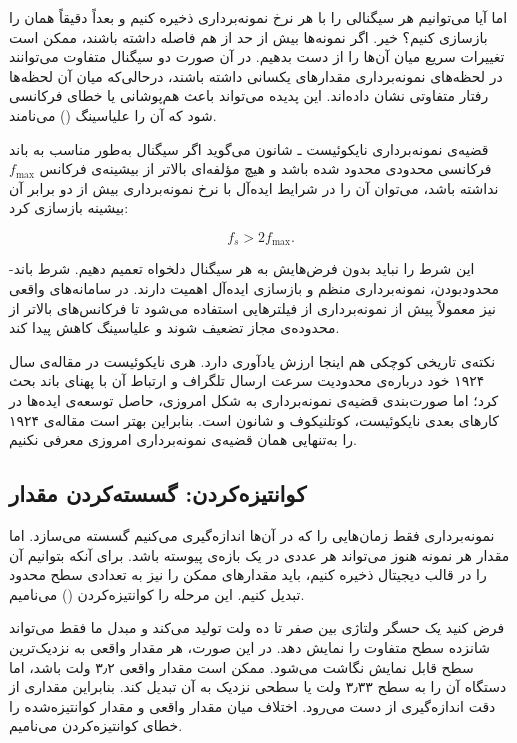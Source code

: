 اما آیا می‌توانیم هر سیگنالی را با هر نرخ نمونه‌برداری ذخیره کنیم و بعداً دقیقاً همان را بازسازی کنیم؟ خیر. اگر نمونه‌ها بیش از حد از هم فاصله داشته باشند، ممکن است تغییرات سریع میان آن‌ها را از دست بدهیم. در آن صورت دو سیگنال متفاوت می‌توانند در لحظه‌های نمونه‌برداری مقدارهای یکسانی داشته باشند، درحالی‌که میان آن لحظه‌ها رفتار متفاوتی نشان داده‌اند. این پدیده می‌تواند باعث هم‌پوشانی یا خطای فرکانسی شود که آن را علیاسینگ () می‌نامند.

قضیه‌ی نمونه‌برداری نایکوئیست ـ شانون می‌گوید اگر سیگنال به‌طور مناسب به باند فرکانسی محدودی محدود شده باشد و هیچ مؤلفه‌ای بالاتر از بیشینه‌ی فرکانس \(f_{\max}\) نداشته باشد، می‌توان آن را در شرایط ایده‌آل با نرخ نمونه‌برداری بیش از دو برابر آن بیشینه بازسازی کرد:

\[
f_s>2f_{\max}.
\]

این شرط را نباید بدون فرض‌هایش به هر سیگنال دلخواه تعمیم دهیم. شرط باند-محدودبودن، نمونه‌برداری منظم و بازسازی ایده‌آل اهمیت دارند. در سامانه‌های واقعی نیز معمولاً پیش از نمونه‌برداری از فیلترهایی استفاده می‌شود تا فرکانس‌های بالاتر از محدوده‌ی مجاز تضعیف شوند و علیاسینگ کاهش پیدا کند. \autocite{cmu-sampling-theorem}

نکته‌ی تاریخی کوچکی هم اینجا ارزش یادآوری دارد. هری نایکوئیست در مقاله‌ی سال ۱۹۲۴ خود درباره‌ی محدودیت سرعت ارسال تلگراف و ارتباط آن با پهنای باند بحث کرد؛ اما صورت‌بندی قضیه‌ی نمونه‌برداری به شکل امروزی، حاصل توسعه‌ی ایده‌ها در کارهای بعدی نایکوئیست، کوتلنیکوف و شانون است. بنابراین بهتر است مقاله‌ی ۱۹۲۴ را به‌تنهایی همان قضیه‌ی نمونه‌برداری امروزی معرفی نکنیم. \autocite{nyquist1924}

\subsection{کوانتیزه‌کردن: گسسته‌کردن مقدار}
\label{sub:quantization-amplitude}

نمونه‌برداری فقط زمان‌هایی را که در آن‌ها اندازه‌گیری می‌کنیم گسسته می‌سازد. اما مقدار هر نمونه هنوز می‌تواند هر عددی در یک بازه‌ی پیوسته باشد. برای آنکه بتوانیم آن را در قالب دیجیتال ذخیره کنیم، باید مقدارهای ممکن را نیز به تعدادی سطح محدود تبدیل کنیم. این مرحله را کوانتیزه‌کردن () می‌نامیم.

فرض کنید یک حسگر ولتاژی بین صفر تا ده ولت تولید می‌کند و مبدل ما فقط می‌تواند شانزده سطح متفاوت را نمایش دهد. در این صورت، هر مقدار واقعی به نزدیک‌ترین سطح قابل نمایش نگاشت می‌شود. ممکن است مقدار واقعی ۳٫۲ ولت باشد، اما دستگاه آن را به سطح ۳٫۳۳ ولت یا سطحی نزدیک به آن تبدیل کند. بنابراین مقداری از دقت اندازه‌گیری از دست می‌رود. اختلاف میان مقدار واقعی و مقدار کوانتیزه‌شده را خطای کوانتیزه‌کردن می‌نامیم.

